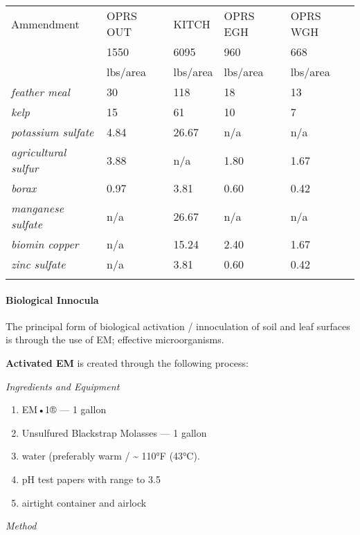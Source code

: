 \begin{longtable}[c]{@{}lllll@{}}
\toprule\addlinespace
Ammendment & OPRS OUT & KITCH & OPRS EGH & OPRS WGH
\\\addlinespace
\midrule\endhead
& 1550 & 6095 & 960 & 668
\\\addlinespace
& lbs/area & lbs/area & lbs/area & lbs/area
\\\addlinespace
\emph{feather meal} & 30 & 118 & 18 & 13
\\\addlinespace
\emph{kelp} & 15 & 61 & 10 & 7
\\\addlinespace
\emph{potassium sulfate} & 4.84 & 26.67 & n/a & n/a
\\\addlinespace
\emph{agricultural sulfur} & 3.88 & n/a & 1.80 & 1.67
\\\addlinespace
\emph{borax} & 0.97 & 3.81 & 0.60 & 0.42
\\\addlinespace
\emph{manganese sulfate} & n/a & 26.67 & n/a & n/a
\\\addlinespace
\emph{biomin copper} & n/a & 15.24 & 2.40 & 1.67
\\\addlinespace
\emph{zinc sulfate} & n/a & 3.81 & 0.60 & 0.42
\\\addlinespace
\bottomrule
\end{longtable}

\paragraph{Biological Innocula}\label{biological-innocula}

The principal form of biological activation / innoculation of soil and
leaf surfaces is through the use of EM; effective microorganisms.

\textbf{Activated EM} is created through the following process:

\emph{Ingredients and Equipment}

\begin{enumerate}
\def\labelenumi{\arabic{enumi}.}
\itemsep1pt\parskip0pt
\item
  EM•1® --- 1 gallon
\item
  Unsulfured Blackstrap Molasses --- 1 gallon
\item
  water (preferably warm / \textasciitilde{} 110°F (43°C).
\item
  pH test papers with range to 3.5
\item
  airtight container and airlock
\end{enumerate}

\emph{Method}


